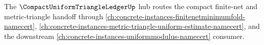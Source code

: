 The $\CompactUniformTriangleLedgerUp$ hub routes the compact finite-net and metric-triangle handoff through \autoref{ch:concrete-instances-finitenetminimumfold-namecert}, \autoref{ch:concrete-instances-metric-triangle-uniform-estimate-namecert}, and the downstream \autoref{ch:concrete-instances-uniformmodulus-namecert} consumer.



